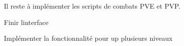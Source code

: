 
\begin{DoxyRefList}
\item[\label{todo__todo000003}%
\Hypertarget{todo__todo000003}%
Fichier \mbox{\hyperlink{index_8php}{index.php}} ]Il reste à implémenter les scripts de combats P\+VE et P\+VP.  
\item[\label{todo__todo000001}%
\Hypertarget{todo__todo000001}%
Fichier \mbox{\hyperlink{modif__stuff_8php}{modif\+\_\+stuff.php}} ]Finir l\textquotesingle{}interface  
\item[\label{todo__todo000002}%
\Hypertarget{todo__todo000002}%
Fichier \mbox{\hyperlink{stuff__modal_8php}{stuff\+\_\+modal.php}} ]Implémenter la fonctionnalité pour up plusieurs niveaux 
\end{DoxyRefList}